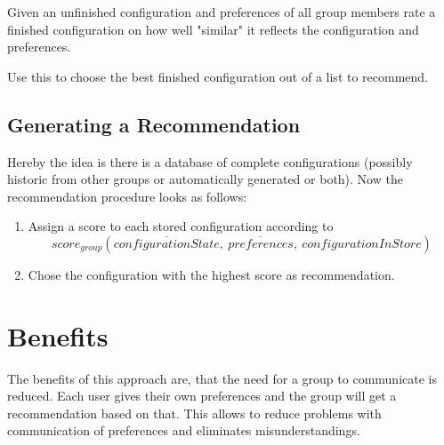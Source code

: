 Given an unfinished configuration and preferences of all group members rate a finished configuration on how well "similar" it reflects the configuration and preferences.

Use this to choose the best finished configuration out of a list to recommend.

\subsection{Generating a Recommendation}

Hereby the idea is there is a database of complete configurations (possibly historic from other groups or automatically generated or both).
Now the recommendation procedure looks as follows:

\begin{enumerate}
    \item Assign a score to each stored configuration according to $$score_{group}(\overline{configurationState},\ \overline{preferences}, \ configurationInStore)$$
    \item Chose the configuration with the highest score as recommendation.
\end{enumerate}



\section{Benefits}

The benefits of this approach are, that the need for a group to communicate is reduced. Each user gives their own preferences and the group will get a recommendation based on that. This allows to reduce problems with communication of preferences and eliminates misunderstandings.
    
